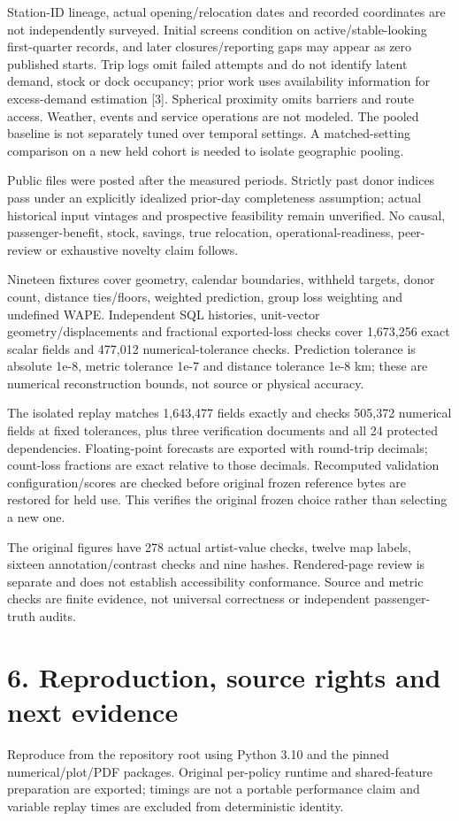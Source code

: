 \documentclass[11pt]{article}
\begin{document}
Station-ID lineage, actual opening/relocation dates and recorded coordinates are not independently surveyed. Initial screens condition on active/stable-looking first-quarter records, and later closures/reporting gaps may appear as zero published starts. Trip logs omit failed attempts and do not identify latent demand, stock or dock occupancy; prior work uses availability information for excess-demand estimation [3]. Spherical proximity omits barriers and route access. Weather, events and service operations are not modeled. The pooled baseline is not separately tuned over temporal settings. A matched-setting comparison on a new held cohort is needed to isolate geographic pooling.

Public files were posted after the measured periods. Strictly past donor indices pass under an explicitly idealized prior-day completeness assumption; actual historical input vintages and prospective feasibility remain unverified. No causal, passenger-benefit, stock, savings, true relocation, operational-readiness, peer-review or exhaustive novelty claim follows.

Nineteen fixtures cover geometry, calendar boundaries, withheld targets, donor count, distance ties/floors, weighted prediction, group loss weighting and undefined WAPE. Independent SQL histories, unit-vector geometry/displacements and fractional exported-loss checks cover 1,673,256 exact scalar fields and 477,012 numerical-tolerance checks. Prediction tolerance is absolute 1e-8, metric tolerance 1e-7 and distance tolerance 1e-8 km; these are numerical reconstruction bounds, not source or physical accuracy.

The isolated replay matches 1,643,477 fields exactly and checks 505,372 numerical fields at fixed tolerances, plus three verification documents and all 24 protected dependencies. Floating-point forecasts are exported with round-trip decimals; count-loss fractions are exact relative to those decimals. Recomputed validation configuration/scores are checked before original frozen reference bytes are restored for held use. This verifies the original frozen choice rather than selecting a new one.

The original figures have 278 actual artist-value checks, twelve map labels, sixteen annotation/contrast checks and nine hashes. Rendered-page review is separate and does not establish accessibility conformance. Source and metric checks are finite evidence, not universal correctness or independent passenger-truth audits.

\newpage\section*{6. Reproduction, source rights and next evidence}
Reproduce from the repository root using Python 3.10 and the pinned numerical/plot/PDF packages. Original per-policy runtime and shared-feature preparation are exported; timings are not a portable performance claim and variable replay times are excluded from deterministic identity.
\end{document}
